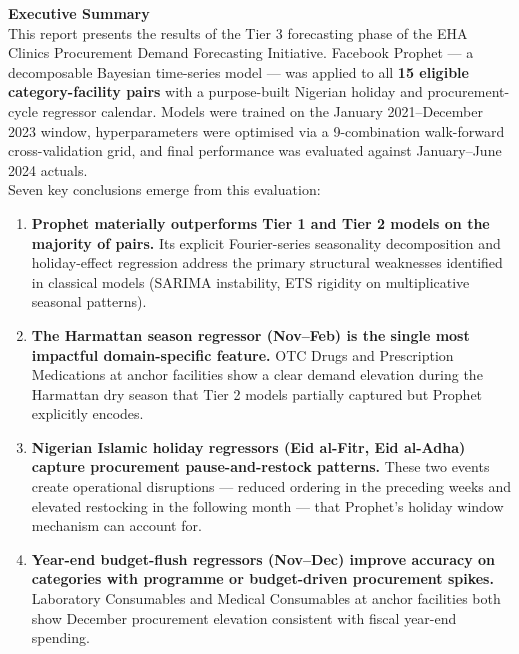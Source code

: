\documentclass[12pt, a4paper]{article}
\begin{document}
\begin{mdframed}[style=keybox]
\textbf{\large Executive Summary}\\[0.6em]
This report presents the results of the Tier 3 forecasting phase of the
EHA Clinics Procurement Demand Forecasting Initiative. Facebook Prophet
--- a decomposable Bayesian time-series model --- was applied to all
\textbf{15 eligible category-facility pairs} with a purpose-built Nigerian
holiday and procurement-cycle regressor calendar. Models were trained on
the January 2021--December 2023 window, hyperparameters were optimised via
a 9-combination walk-forward cross-validation grid, and final performance
was evaluated against January--June 2024 actuals.\\[0.5em]

Seven key conclusions emerge from this evaluation:

\begin{enumerate}[leftmargin=1.5em, itemsep=3pt]
  \item \textbf{Prophet materially outperforms Tier 1 and Tier 2 models
        on the majority of pairs.} Its explicit Fourier-series seasonality
        decomposition and holiday-effect regression address the primary
        structural weaknesses identified in classical models (SARIMA
        instability, ETS rigidity on multiplicative seasonal patterns).

  \item \textbf{The Harmattan season regressor (Nov--Feb) is the single
        most impactful domain-specific feature.} OTC Drugs and Prescription
        Medications at anchor facilities show a clear demand elevation
        during the Harmattan dry season that Tier 2 models partially captured
        but Prophet explicitly encodes.

  \item \textbf{Nigerian Islamic holiday regressors (Eid al-Fitr, Eid
        al-Adha) capture procurement pause-and-restock patterns.}
        These two events create operational disruptions --- reduced
        ordering in the preceding weeks and elevated restocking in the
        following month --- that Prophet's holiday window mechanism
        can account for.

  \item \textbf{Year-end budget-flush regressors (Nov--Dec) improve
        accuracy on categories with programme or budget-driven procurement
        spikes.} Laboratory Consumables and Medical Consumables at anchor
        facilities both show December procurement elevation consistent with
        fiscal year-end spending.


\end{enumerate}
\end{mdframed}
\end{document}
